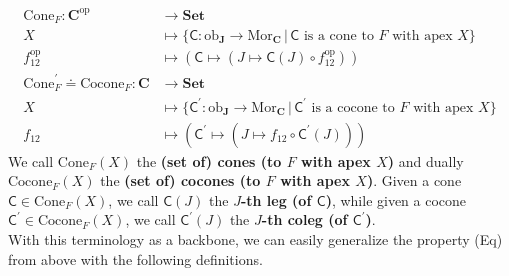 \begin{align*}
  \mathrm{Cone}_{F}
  \colon
  \mathbf{C}^{\mathrm{op}}
  &\rightarrow
  \mathbf{Set}
  \\
  X
  &\mapsto
  \lbrace
      \mathsf{C}
      \colon
      \mathrm{ob}_{\mathbf{J}}
      \rightarrow
      \mathrm{Mor}_{\mathbf{C}}
    \,
    \vert
    \,
      \mathsf{C}
      \text{ is a cone to }
      F
      \text{ with apex }
      X
  \rbrace
  \\
  f_{12}^{\mathrm{op}}
  &\mapsto
  \left(
    \mathsf{C}
    \mapsto
    \left(
      J
      \mapsto
      \mathsf{C}(J)
      \circ
      f_{12}^{\mathrm{op}}
    \right)
  \right)
  \\
  \mathrm{Cone}_{F}^{\prime}
  \doteq
  \mathrm{Cocone}_{F}
  \colon
  \mathbf{C}
  &\rightarrow
  \mathbf{Set}
  \\
  X
  &\mapsto
  \lbrace
      \mathsf{C}^{\prime}
      \colon
      \mathrm{ob}_{\mathbf{J}}
      \rightarrow
      \mathrm{Mor}_{\mathbf{C}}
    \,
    \vert
    \,
      \mathsf{C}^{\prime}
      \text{ is a cocone to }
      F
      \text{ with apex }
      X
  \rbrace
  \\
  f_{12}
  &\mapsto
  \left(
    \mathsf{C}^{\prime}
    \mapsto
    \left(
      J
      \mapsto
      f_{12}
      \circ
      \mathsf{C}^{\prime}(J)
    \right)
  \right)
\end{align*}
We call $\mathrm{Cone}_{F}(X)$ the \textbf{(set of) cones (to $F$ with apex $X$)} and dually $\mathrm{Cocone}_{F}(X)$ the \textbf{(set of) cocones (to $F$ with apex $X$)}.
Given a cone $\mathsf{C} \in \mathrm{Cone}_{F}(X)$, we call $\mathsf{C}(J)$ the \textbf{$J$-th leg (of $\mathsf{C}$)}, while given a cocone $\mathsf{C}^{\prime} \in \mathrm{Cocone}_{F}(X)$, we call $\mathsf{C}^{\prime}(J)$ the \textbf{$J$-th coleg (of $\mathsf{C}^{\prime}$)}.
\\
With this terminology as a backbone, we can easily generalize the property (Eq) from above with the following definitions.
